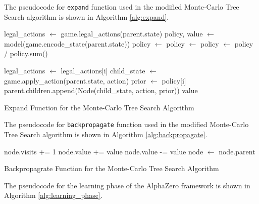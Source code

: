 The pseudocode for \verb|expand| function used in the modified Monte-Carlo Tree Search algorithm is shown in Algorithm \ref{alg:expand}.

\begin{algorithm}[htb]
    \begin{algorithmic}[1]
            \State legal\_actions $\gets$ game.legal\_actions(parent.state)
            \State policy, value $\gets$ model(game.encode\_state(parent.state))
            \State policy $\gets$ 
            \State policy $\gets$ 
            \State policy $\gets$ policy / policy.sum()
        
                \State legal\_actions $\gets$ legal\_actions[i]
                \State child\_state $\gets$ game.apply\_action(parent.state, action)
                \State prior $\gets$ policy[i]
                \State parent.children.append(Node(child\_state, action, prior))
            \EndFor
            \State \Return value
        \EndFunction
    \end{algorithmic}
    \caption{Expand Function for the Monte-Carlo Tree Search Algorithm}
    \label{alg:expand}
\end{algorithm}

The pseudocode for \verb|backpropagate| function used in the modified Monte-Carlo Tree Search algorithm is shown in Algorithm \ref{alg:backpropagate}.

\begin{algorithm}[htb]
    \begin{algorithmic}[1]
                \State node.visits += 1
                    \State node.value += value
                \Else
                    \State node.value -= value
                \EndIf
                \State node $\gets$ node.parent
            \EndWhile
        \EndFunction
    \end{algorithmic}
    \caption{Backpropagrate Function for the Monte-Carlo Tree Search Algorithm}
    \label{alg:backpropagate}
\end{algorithm}


The pseudocode for the  learning phase of the AlphaZero framework is shown in Algorithm \ref{alg:learning_phase}.

